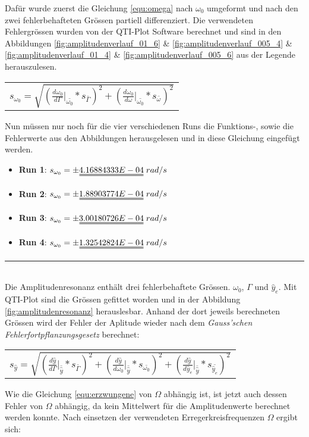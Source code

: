 Dafür wurde zuerst die Gleichung \ref{equ:omega} nach $\omega_{0}$ umgeformt und nach den zwei fehlerbehafteten Grössen partiell differenziert. Die verwendeten Fehlergrössen wurden von der QTI-Plot Software berechnet und sind in den Abbildungen \ref{fig:amplitudenverlauf_01_6} \& \ref{fig:amplitudenverlauf_005_4} \& \ref{fig:amplitudenverlauf_01_4} \& \ref{fig:amplitudenverlauf_005_6} aus der Legende herauszulesen.
\begin{table}[H]
\centering
\begin{tabular}{c}
{\large $s_{\omega_{0}}=\sqrt{(\frac{d\omega_{0}}{d\Gamma}\bigg\vert_{\bar{\omega_{0}}}*s_{\bar{\Gamma}})^{2}+(\frac{d\omega_{0}}{d\omega}\bigg\vert_{\bar{\omega_{0}}}*s_{\bar{\omega}})^{2}}$}
\end{tabular} 
\end{table}
Nun müssen nur noch für die vier verschiedenen Runs die Funktions-, sowie die Fehlerwerte aus den Abbildungen herausgelesen und in diese Gleichung eingefügt werden.
\begin{itemize}
\centering
\item \textbf{Run 1}: $s_{\omega_{0}}=\pm\uuline{4.16884333E-04}\;rad/s$
\item \textbf{Run 2}: $s_{\omega_{0}}=\pm\uuline{1.88903774E-04}\;rad/s$
\item \textbf{Run 3}: $s_{\omega_{0}}=\pm\uuline{3.00180726E-04}\;rad/s$
\item \textbf{Run 4}: $s_{\omega_{0}}=\pm\uuline{1.32542824E-04}\;rad/s$
\end{itemize}
\newpage
\noindent\rule{\textwidth}{0.4pt}
\\[0.4cm]
Die Amplitudenresonanz enthält drei fehlerbehaftete Grössen. $\omega_{0}$, $\Gamma$ und $\hat{y}_{e}$. Mit QTI-Plot sind die Grössen gefittet worden und in der Abbildung \ref{fig:amplitudenresonanz} herauslesbar. Anhand der dort jeweils berechneten Grössen wird der Fehler der Aplitude wieder nach dem \textit{Gauss'schen Fehlerfortpflanzungsgesetz} berechnet:
\begin{table}[H]
\centering
\begin{tabular}{c}
{\Large $s_{\hat{y}}=\sqrt{(\frac{d\hat{y}}{d\Gamma}\bigg\vert_{\bar{\hat{y}}}*s_{\bar{\Gamma}})^{2} + (\frac{d\hat{y}}{d\omega_{0}}\bigg\vert_{\bar{\hat{y}}}*s_{\bar{\omega_{0}}})^{2} + (\frac{d\hat{y}}{d\hat{y}_{e}}\bigg\vert_{\bar{\hat{y}}}*s_{\bar{\hat{y}_{e}}})^{2}}$}
\end{tabular} 
\end{table}
Wie die Gleichung \ref{equ:erzwungene} von $\Omega$ abhängig ist, ist jetzt auch dessen Fehler von $\Omega$ abhängig, da kein Mittelwert für die Amplitudenwerte berechnet werden konnte. Nach einsetzen der verwendeten Erregerkreisfrequenzen $\Omega$ ergibt sich:
